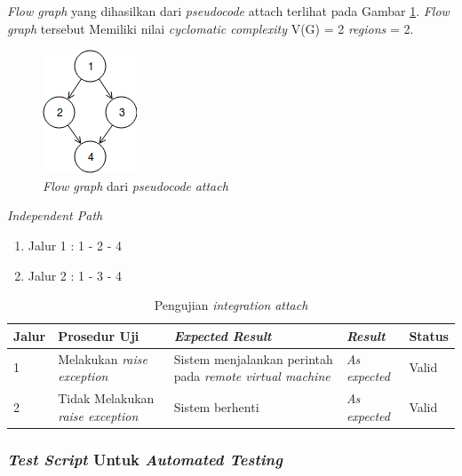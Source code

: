 \par\null\par
\noindent
\emph{Flow graph} yang dihasilkan dari \emph{pseudocode}
attach terlihat pada Gambar \ref{cfg:attach-c}. \emph{Flow graph} tersebut Memiliki
nilai \emph{cyclomatic complexity} V(G) = 2 \emph{regions} = 2.

\begin{figure}[H]
  \centering
  \includegraphics[width=.17\linewidth]{img/test-case/attach-c}
  \caption{\emph{Flow graph} dari \emph{pseudocode} \emph{attach}}
  \label{cfg:attach-c}
\end{figure}

\noindent
\emph{Independent Path}

\begin{enumerate}
\item Jalur 1 : 1 - 2 - 4
\item Jalur 2 : 1 - 3 - 4
\end{enumerate}

\begin{longtable}{|P{.06\textwidth}|P{.29\textwidth}|P{.29\textwidth}|P{.12\textwidth}|P{.08\textwidth}|}
  \caption{Pengujian \emph{integration} \emph{attach}} \label{jalur:attach-c} \\
  \hline
  \textbf{Jalur} & \textbf{Prosedur Uji} & \textbf{\emph{Expected Result}}
  & \textbf{\emph{Result}} & \textbf{Status} \\\hline
  1 & Melakukan \emph{raise exception} & Sistem menjalankan perintah pada
                                         \emph{remote virtual machine} & \emph{As expected} & Valid \\\hline
  2 & Tidak Melakukan \emph{raise exception} & Sistem berhenti & \emph{As expected} & Valid \\\hline
\end{longtable}

\subsubsection{\emph{Test Script} Untuk \emph{Automated Testing}}

